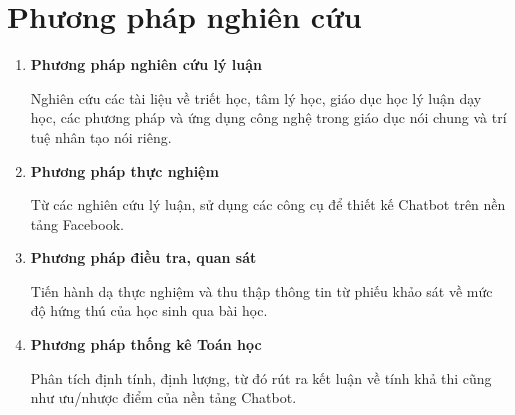 \section{Phương pháp nghiên cứu}
\begin{enumerate}[label=\textbf{\thesection.\arabic*.},align=left,left=0cm..1cm]
	\item \textbf{Phương pháp nghiên cứu lý luận}\par
	Nghiên cứu các tài liệu về triết học, tâm lý học, giáo dục học lý luận dạy học, các phương pháp và ứng dụng công nghệ trong giáo dục nói chung và trí tuệ nhân tạo nói riêng.
	\item \textbf{Phương pháp thực nghiệm} \par
	Từ các nghiên cứu lý luận, sử dụng các công cụ để thiết kế Chatbot trên nền tảng Facebook.
	\item \textbf{Phương pháp điều tra, quan sát} \par
	Tiến hành dạ thực nghiệm và thu thập thông tin từ phiếu khảo sát về mức độ hứng thú của học sinh qua bài học.
	\item \textbf{Phương pháp thống kê Toán học} \par
	Phân tích định tính, định lượng, từ đó rút ra kết luận về tính khả thi cũng như ưu/nhược điểm của nền tảng Chatbot.
\end{enumerate}

\renewcommand*{\thesection}{\arabic{chapter}.\arabic{section}}
\renewcommand*{\thesubsection}{\arabic{chapter}.\arabic{section}.\arabic{subsection}}

